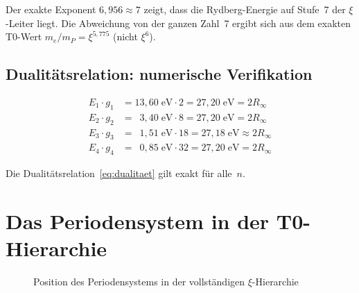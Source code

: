 Der exakte Exponent $6{,}956 \approx 7$ zeigt, dass die Rydberg-Energie
auf Stufe~7 der $\xi$-Leiter liegt. Die Abweichung von der ganzen Zahl~7
ergibt sich aus dem exakten T0-Wert $m_e/m_P = \xi^{5{,}775}$ (nicht $\xi^6$).

\subsection{Dualitätsrelation: numerische Verifikation}

\begin{align}
  E_1 \cdot g_1 &= 13{,}60\;\text{eV} \cdot 2  = 27{,}20\;\text{eV} = 2R_\infty \\
  E_2 \cdot g_2 &= \phantom{0}3{,}40\;\text{eV} \cdot 8  = 27{,}20\;\text{eV} = 2R_\infty \\
  E_3 \cdot g_3 &= \phantom{0}1{,}51\;\text{eV} \cdot 18 = 27{,}18\;\text{eV} \approx 2R_\infty \\
  E_4 \cdot g_4 &= \phantom{0}0{,}85\;\text{eV} \cdot 32 = 27{,}20\;\text{eV} = 2R_\infty
\end{align}

Die Dualitätsrelation~\eqref{eq:dualitaet} gilt exakt für alle~$n$.

\section{Das Periodensystem in der T0-Hierarchie}
\label{sec:hierarchie}

\begin{figure}[htbp]
\centering
{}
\caption{Position des Periodensystems in der vollständigen $\xi$-Hierarchie}
\label{fig:hierarchie}
\end{figure}

